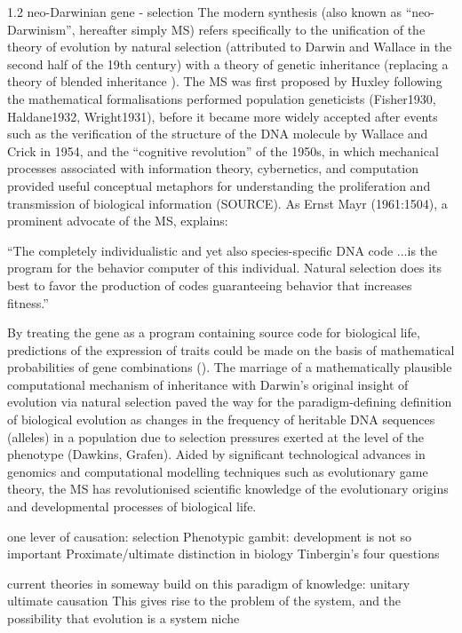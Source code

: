 1.2 neo-Darwinian gene - selection
The modern synthesis (also known as ``neo-Darwinism'', hereafter simply MS) refers specifically to the unification of the theory of evolution by natural selection (attributed to Darwin and Wallace in the second half of the 19th century) with a theory of genetic inheritance (replacing a theory of blended inheritance ). The MS was first proposed by Huxley following the mathematical formalisations performed population geneticists (Fisher1930, Haldane1932, Wright1931), before it became more widely accepted after events such as the verification of the structure of the DNA molecule by Wallace and Crick in 1954, and the ``cognitive revolution'' of the 1950s, in which mechanical processes associated with information theory, cybernetics, and computation provided useful conceptual metaphors for understanding the proliferation and transmission of biological information (SOURCE).  As Ernst Mayr (1961:1504), a prominent advocate of the MS, explains:

``The completely individualistic and yet also species-specific DNA code ...is the program for the behavior computer of this individual. Natural selection does its best to favor the production of codes guaranteeing behavior that increases fitness.''

By treating the gene as a program containing source code for biological life, predictions of the expression of traits could be made on the basis of mathematical probabilities of gene combinations (\citep{Dawkins1972;Dawkins1982}). The marriage of a mathematically plausible computational mechanism of inheritance with Darwin's original insight of evolution via natural selection paved the way for the paradigm-defining definition of biological evolution as changes in the frequency of heritable DNA sequences (alleles) in a population due to selection pressures exerted at the level of the phenotype (Dawkins, Grafen). Aided by significant technological advances in genomics and computational modelling techniques such as evolutionary game theory, the MS has revolutionised scientific knowledge of the evolutionary origins and developmental processes of biological life.

one lever of causation: selection
Phenotypic gambit: development is not so important
Proximate/ultimate distinction in biology
Tinbergin's four questions

current theories in someway build on this paradigm of knowledge: unitary ultimate causation
This gives rise to the problem of the system, and the possibility that evolution is a system niche




